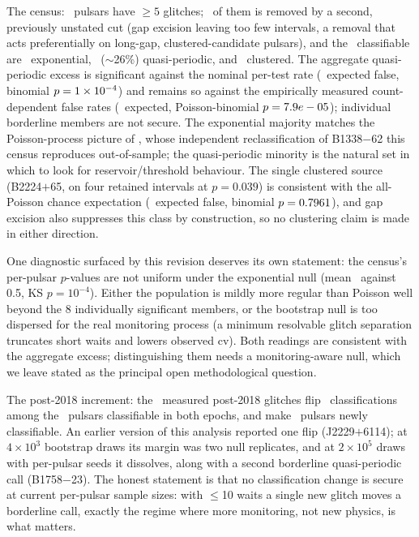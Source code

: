 \documentclass[twocolumn]{aastex631}
\begin{document}
The census: \gpRealNGeCut\ pulsars have $\ge5$ glitches; \gpRealNDropped\ of them is
removed by a second, previously unstated cut (gap excision leaving too few intervals, a
removal that acts preferentially on long-gap, clustered-candidate pulsars), and the
\gpRealNFit\ classifiable are \gpRealNExp\ exponential, \gpRealNQp\ ($\sim$26\%)
quasi-periodic, and \gpRealNClustered\ clustered. The aggregate quasi-periodic excess is
significant against the nominal per-test rate (\gpRealExpectedFalseQp\ expected false, binomial
$p=1\times10^{-4}$) and remains so against the empirically measured count-dependent false
rates (\gpRealExpectedFalseQpEmp\ expected, Poisson-binomial $p=7.9e-05$);
individual borderline members are not secure. The exponential majority matches the
Poisson-process picture of \citet{howitt2018}, whose independent reclassification of
B1338$-$62 this census reproduces out-of-sample; the quasi-periodic minority is the natural set
in which to look for reservoir/threshold behaviour. The single clustered source (B2224$+$65, on
four retained intervals at $p=0.039$) is consistent with the all-Poisson chance expectation
(\gpRealExpectedFalseClustered\ expected false, binomial $p=0.7961$), and gap
excision also suppresses this class by construction, so no clustering claim is made in
either direction.

One diagnostic surfaced by this revision deserves its own statement: the census's per-pulsar
$p$-values are not uniform under the exponential null (mean \gpRealMeanPRegular\ against 0.5,
KS $p=10^{-4}$). Either the population is mildly more regular than Poisson well beyond the 8
individually significant members, or the bootstrap null is too dispersed for the real
monitoring process (a minimum resolvable glitch separation truncates short waits and lowers
observed cv). Both readings are consistent with the aggregate excess; distinguishing them needs
a monitoring-aware null, which we leave stated as the principal open methodological question.

The post-2018 increment: the \gpRealNPostSplit\ measured post-2018 glitches flip
\gpRealNFlipped\ classifications among the \gpRealNStable\ pulsars classifiable in both
epochs, and make \gpRealNNewly\ pulsars newly classifiable. An earlier version of this
analysis reported one flip (J2229$+$6114); at $4\times10^3$ bootstrap draws its margin was two
null replicates, and at $2\times10^5$ draws with per-pulsar seeds it dissolves, along with a
second borderline quasi-periodic call (B1758$-$23). The honest statement is that no
classification change is secure at current per-pulsar sample sizes: with $\le$10 waits a
single new glitch moves a borderline call, exactly the regime where more monitoring, not new
physics, is what matters.
\end{document}
